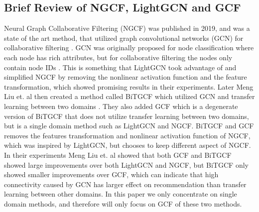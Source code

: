 \subsection{Brief Review of NGCF, LightGCN and GCF}
Neural Graph Collaborative Filtering (NGCF) was published in 2019, and was a state of the art method, that utilized graph convolutional networks (GCN) for collaborative filtering \cite{NGCF_2019}.
GCN was originally proposed for node classification where each node has rich attributes, but for collaborative filtering the nodes only contain node IDs \cite{lightgcn,kipf2017semisupervised,NGCF_2019}.
This is something that LightGCN took advantage of and simplified NGCF by removing the nonlinear activation function and the feature transformation, which showed promising results in their experiments.
Later Meng Liu et. al then created a method called BiTGCF which utilized GCN and transfer learning between two domains \cite{BiTGCF}.
They also added GCF which is a degenerate version of BiTGCF that does not utilize transfer learning between two domains, but is a single domain method such as LightGCN and NGCF.
BiTGCF and GCF removes the features transformation and nonlinear activation function of NGCF, which was inspired by LightGCN, but chooses to keep different aspect of NGCF.
In their experiments Meng Liu et. al showed that both GCF and BiTGCF showed large improvements over both LightGCN and NGCF, but BiTGCF only showed smaller improvements over GCF, which can indicate that high connectivity caused by GCN has larger effect on recommendation than transfer learning between other domains.
In this paper we only concentrate on single domain methods, and therefore will only focus on GCF of these two methods.

